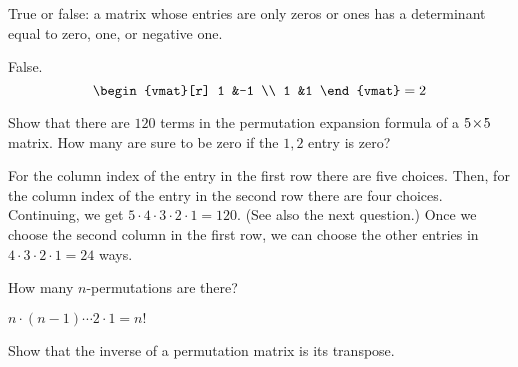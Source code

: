\begin{exercises}
\begin{answer}
    \end{answer}
  \item 
    \cite{Strang}
    True or false: a matrix whose entries are only zeros
    or ones has a determinant equal to zero, one, or negative one.
    \begin{answer}
      False.
      \begin{equation*}
        \begin{vmat}[r]
          1  &-1  \\
          1  &1
        \end{vmat}
        =2
      \end{equation*} 
     \end{answer}
  \item 
    \begin{exparts}
      \partsitem Show that there are $120$ terms in the permutation
         expansion formula of a \( 5 \! \times \! 5 \) matrix.
      \partsitem 
         How many are sure to be zero if the \( 1,2 \) entry is zero?
    \end{exparts}
    \begin{answer}
      \begin{exparts}
        \partsitem For the column index of the entry in the first row there are
          five choices.
          Then, for the column index of the entry in the second row there
          are four choices.
          Continuing, we get $5\cdot 4\cdot 3\cdot 2\cdot 1=120$.
          (See also the next question.)
        \partsitem Once we choose the second column in the first row, 
          we can choose the other entries in \( 4\cdot 3\cdot 2\cdot 1=24 \) 
          ways.
      \end{exparts}  
    \end{answer}
  \item 
    How many \( n \)-permutations are there?
    \begin{answer}
       \( n\cdot(n-1)\cdots 2\cdot 1=n! \) 
    \end{answer}
  \item Show that the inverse of a permutation matrix is its transpose.
\end{exercises}
